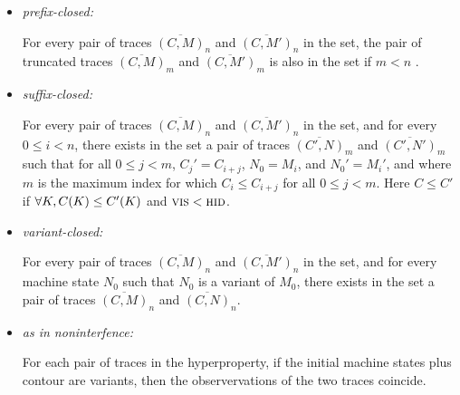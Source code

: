 \documentclass[conference]{IEEEtran}
\begin{document}
\begin{itemize}
\item {\em prefix-closed:}

  For every pair of traces $\overline{(C, M)}_n$ and $\overline{(C,
    M')}_n$ in the set,  the
  pair of truncated traces $\overline{(C,
    M)}_m$ and $\overline{(C, M')}_m$ is also in the set if $m < n$ .

\item {\em suffix-closed:}

  For every pair of traces $\overline{(C, M)}_n$ and $\overline{(C,
    M')}_n$ in the set, and for every $0 \leq i < n$, there exists in
  the set a pair of traces $\overline{(C', N)}_m$ and $\overline{(C',
    N')}_m$ such that for all $0 \leq j < m$, $C_j' = C_{i+j}$, $N_0 =
  M_i$, and $N_0' = M_i'$, and where $m$ is the maximum index for
  which $C_i \leq C_{i+j}$ for all $0 \leq j < m$. Here $C \leq C'$ if
  $\forall K, C(K) \leq C'(K)$ and $\textsc{vis} <
  \textsc{hid}$.

\item {\em variant-closed:}

  For every pair of traces $\overline{(C, M)}_n$ and $\overline{(C,
    M')}_n$ in the set, and for every machine state $N_0$ such that
  $N_0$ is a variant of $M_0$, there exists in the set a pair of
  traces $\overline{(C, M)}_n$ and $\overline{(C, N)}_n$.


\item {\em as in noninterfence:}

  For each pair of traces in the hyperproperty, if the initial machine
  states plus contour  are variants, then the observervations of the
  two traces coincide.

\end{itemize}

\end{document}
